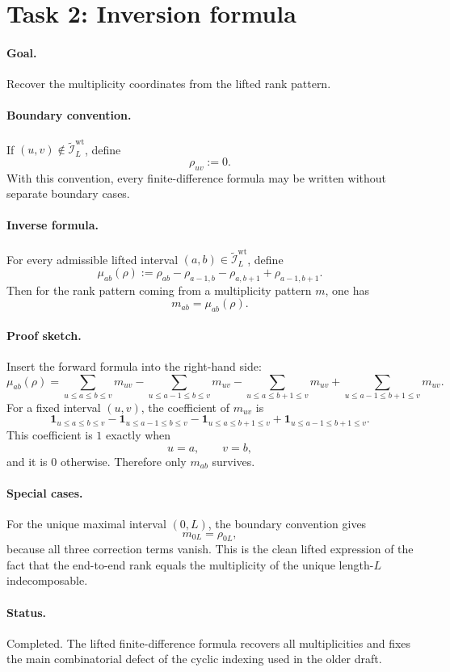 \section*{Task 2: Inversion formula}

\paragraph{Goal.}
Recover the multiplicity coordinates from the lifted rank pattern.

\paragraph{Boundary convention.}
If \((u,v)\notin \widetilde{\mathcal I}_L^{\mathrm{wt}}\), define
\[
\rho_{uv}:=0.
\]
With this convention, every finite-difference formula may be written without
separate boundary cases.

\paragraph{Inverse formula.}
For every admissible lifted interval \((a,b)\in \widetilde{\mathcal I}_L^{\mathrm{wt}}\),
define
\[
\mu_{ab}(\rho)
:=
\rho_{ab}-\rho_{a-1,b}-\rho_{a,b+1}+\rho_{a-1,b+1}.
\]
Then for the rank pattern coming from a multiplicity pattern \(m\), one has
\[
m_{ab}=\mu_{ab}(\rho).
\]

\paragraph{Proof sketch.}
Insert the forward formula into the right-hand side:
\[
\mu_{ab}(\rho)
=
\sum_{u\le a\le b\le v} m_{uv}
-
\sum_{u\le a-1\le b\le v} m_{uv}
-
\sum_{u\le a\le b+1\le v} m_{uv}
+
\sum_{u\le a-1\le b+1\le v} m_{uv}.
\]
For a fixed interval \((u,v)\), the coefficient of \(m_{uv}\) is
\[
\mathbf 1_{u\le a\le b\le v}
-
\mathbf 1_{u\le a-1\le b\le v}
-
\mathbf 1_{u\le a\le b+1\le v}
+
\mathbf 1_{u\le a-1\le b+1\le v}.
\]
This coefficient is \(1\) exactly when
\[
u=a,\qquad v=b,
\]
and it is \(0\) otherwise. Therefore only \(m_{ab}\) survives.

\paragraph{Special cases.}
For the unique maximal interval \((0,L)\), the boundary convention gives
\[
m_{0L}=\rho_{0L},
\]
because all three correction terms vanish. This is the clean lifted expression
of the fact that the end-to-end rank equals the multiplicity of the unique
length-\(L\) indecomposable.

\paragraph{Status.}
Completed. The lifted finite-difference formula recovers all multiplicities and
fixes the main combinatorial defect of the cyclic indexing used in the older
draft.
